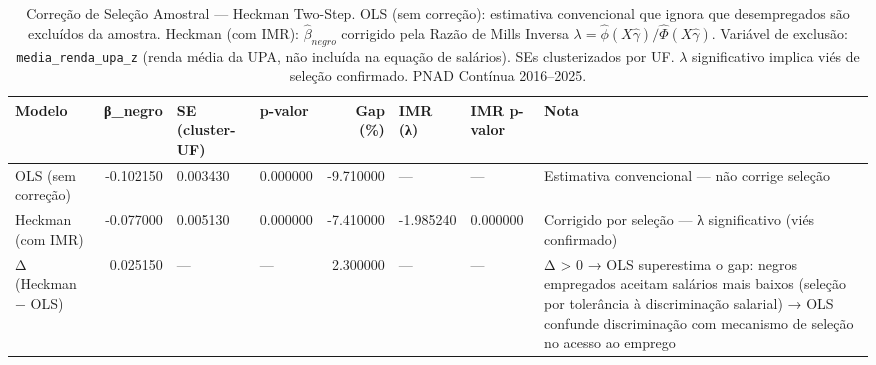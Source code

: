 \begin{table}
\caption{Correção de Seleção Amostral — Heckman Two-Step. OLS (sem correção): estimativa convencional que ignora que desempregados são excluídos da amostra. Heckman (com IMR): $\hat{\beta}_{negro}$ corrigido pela Razão de Mills Inversa $\lambda = \hat{\phi}(X\hat{\gamma}) / \hat{\Phi}(X\hat{\gamma})$. Variável de exclusão: \texttt{media\_renda\_upa\_z} (renda média da UPA, não incluída na equação de salários). SEs clusterizados por UF. $\lambda$ significativo implica viés de seleção confirmado. PNAD Contínua 2016--2025.}
\label{tab:heckman_comparacao}
\begin{tabular}{lrllrlll}
\toprule
Modelo & β\_negro & SE (cluster-UF) & p-valor & Gap (\%) & IMR (λ) & IMR p-valor & Nota \\
\midrule
OLS (sem correção) & -0.102150 & 0.003430 & 0.000000 & -9.710000 & — & — & Estimativa convencional — não corrige seleção \\
Heckman (com IMR) & -0.077000 & 0.005130 & 0.000000 & -7.410000 & -1.985240 & 0.000000 & Corrigido por seleção — λ significativo (viés confirmado) \\
Δ (Heckman − OLS) & 0.025150 & — & — & 2.300000 & — & — & Δ > 0 → OLS superestima o gap: negros empregados aceitam salários mais baixos (seleção por tolerância à discriminação salarial) → OLS confunde discriminação com mecanismo de seleção no acesso ao emprego \\
\bottomrule
\end{tabular}
\end{table}
